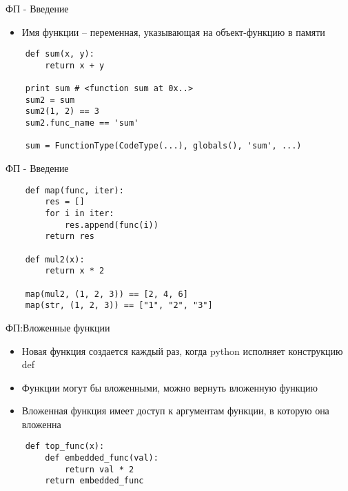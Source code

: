 \documentclass{article}
\begin{document}
\begin{center} ФП - Введение \end{center}
\begin{itemize}
    \item Имя функции – переменная, указывающая на объект-функцию в памяти
\end{itemize}
\vspace{15pt}
\begin{lstlisting}
    def sum(x, y):
        return x + y

    print sum # <function sum at 0x..>
    sum2 = sum
    sum2(1, 2) == 3
    sum2.func_name == 'sum'

    sum = FunctionType(CodeType(...), globals(), 'sum', ...)
\end{lstlisting}
\newpage

\begin{center} ФП - Введение \end{center}
\vspace{15pt}
\begin{lstlisting}
    def map(func, iter):
        res = []
        for i in iter:
            res.append(func(i))
        return res

    def mul2(x):
        return x * 2

    map(mul2, (1, 2, 3)) == [2, 4, 6]
    map(str, (1, 2, 3)) == ["1", "2", "3"]
\end{lstlisting}
\newpage

\begin{center} ФП:Вложенные функции \end{center}
\begin{itemize}
    \item Новая функция создается каждый раз, когда python исполняет конструкцию def
    \item Функции могут бы вложенными, можно вернуть вложенную функцию
    \item Вложенная функция имеет доступ к аргументам функции, в которую она вложенна
\end{itemize}
\vspace{15pt}
\begin{lstlisting}
    def top_func(x):
        def embedded_func(val):
            return val * 2
        return embedded_func
\end{lstlisting}
\newpage
\end{document}
